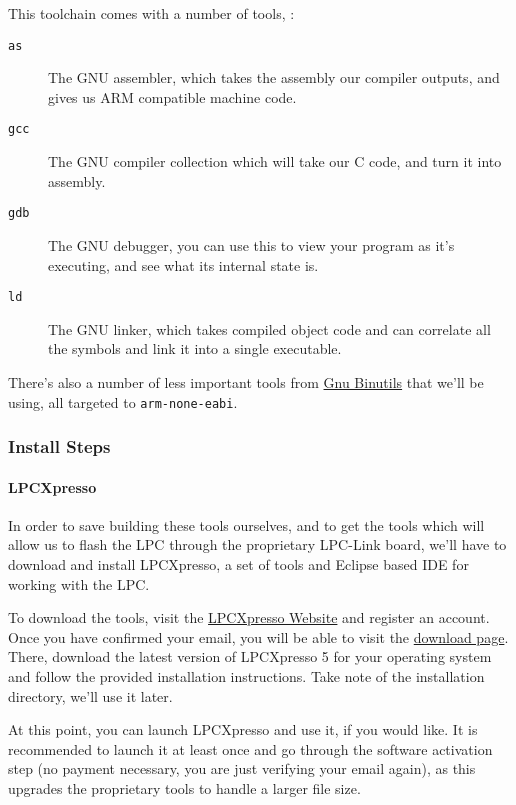 \documentclass[]{article}
\begin{document}
This toolchain comes with a number of tools, :

\begin{description}
\item[\texttt{as}]
The GNU assembler, which takes the assembly our compiler outputs, and
gives us ARM compatible machine code.
\item[\texttt{gcc}]
The GNU compiler collection which will take our C code, and turn it into
assembly.
\item[\texttt{gdb}]
The GNU debugger, you can use this to view your program as it's
executing, and see what its internal state is.
\item[\texttt{ld}]
The GNU linker, which takes compiled object code and can correlate all
the symbols and link it into a single executable.
\end{description}

There's also a number of less important tools from
\href{http://www.gnu.org/software/binutils/}{Gnu Binutils} that we'll be
using, all targeted to \texttt{arm-none-eabi}.

\subsubsection{Install Steps}

\paragraph{LPCXpresso}

In order to save building these tools ourselves, and to get the tools
which will allow us to flash the LPC through the proprietary LPC-Link
board, we'll have to download and install LPCXpresso, a set of tools and
Eclipse based IDE for working with the LPC.

To download the tools, visit the
\href{http://lpcxpresso.code-red-tech.com/LPCXpresso/}{LPCXpresso
Website} and register an account. Once you have confirmed your email,
you will be able to visit the
\href{http://lpcxpresso.code-red-tech.com/LPCXpresso/Downloads}{download
page}. There, download the latest version of LPCXpresso 5 for your
operating system and follow the provided installation instructions. Take
note of the installation directory, we'll use it later.

At this point, you can launch LPCXpresso and use it, if you would like.
It is recommended to launch it at least once and go through the software
activation step (no payment necessary, you are just verifying your email
again), as this upgrades the proprietary tools to handle a larger file
size.
\end{document}
